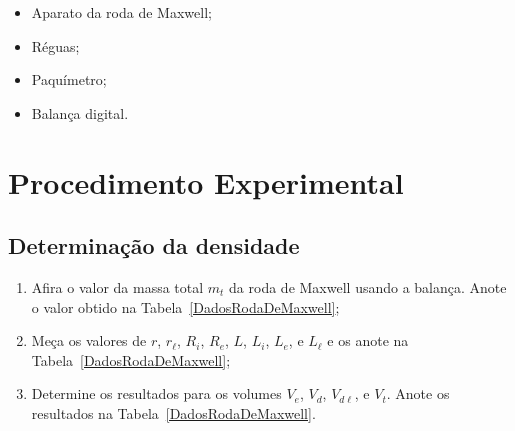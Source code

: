 \begin{itemize}
	\item Aparato da roda de Maxwell;
    \item Réguas;
    \item Paquímetro;
	\item Balança digital.
\end{itemize}

\section{Procedimento Experimental}

\subsection{Determinação da densidade}
\begin{enumerate}
	\item Afira o valor da massa total $m_t$ da roda de Maxwell usando a balança. Anote o valor obtido na Tabela~\ref{DadosRodaDeMaxwell};
	\item Meça os valores de $r$, $r_\ell$, $R_i$, $R_e$, $L$, $L_i$, $L_e$, e $L_\ell$ e os anote na Tabela~\ref{DadosRodaDeMaxwell};
	\item Determine os resultados para os volumes $V_e$, $V_d$, $V_{d\ell}$, e $V_t$. Anote os resultados na Tabela~\ref{DadosRodaDeMaxwell}.
\end{enumerate}

